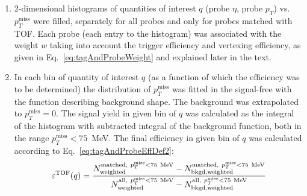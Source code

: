 \begin{enumerate}
 \item 2-dimensional histograms of quantities of interest $q$ (probe $\eta$, probe $p_{T}$) vs. $p_{T}^{\text{miss}}$ were filled, separately for all probes and only for probes matched with TOF. Each probe (each entry to the histogram) was associated with the weight $w$ taking into account the trigger efficiency and vertexing efficiency, as given in Eq.~\eqref{eq:tagAndProbeWeight} and explained later in the text.\\[-16pt]
 \item In each bin of quantity of interest $q$ (as a function of which the efficiency was to be determined) the distribution of $p_{T}^{\text{miss}}$ was fitted  in the signal-free with the function describing background shape. The background was extrapolated to $p_{T}^{\text{miss}}=0$. The signal yield in given bin of $q$ was calculated as the integral of the histogram with subtracted integral of the background function, both in the range $p_{T}^{\text{miss}}<75$~MeV. The final efficiency in given bin of $q$ was calculated according to Eq.~\eqref{eq:tagAndProbeEffDef2}:
 \begin{equation}\label{eq:tagAndProbeEffDef2}
  \varepsilon^{\text{TOF}}(q) = \frac{N_\text{weighted}^{\text{matched},~p_{T}^{\text{miss}}<75~\text{MeV}} - N_\text{bkgd,weighted}^{\text{matched},~p_{T}^{\text{miss}}<75~\text{MeV}} }{ N_\text{weighted}^{\text{all},~p_{T}^{\text{miss}}<75~\text{MeV}} - N_\text{bkgd,weighted}^{\text{all},~p_{T}^{\text{miss}}<75~\text{MeV}} }\vspace*{-25pt}
 \end{equation}

\end{enumerate}

